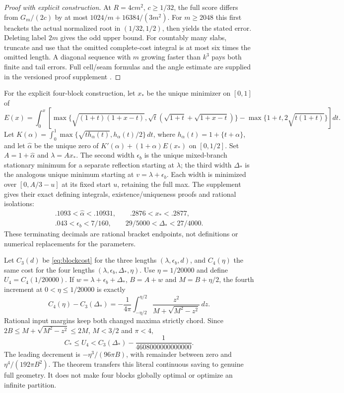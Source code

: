 \documentclass[11pt]{article}
\theoremstyle{definition}\newtheorem{definition}[theorem]{Definition}
\theoremstyle{remark}\newtheorem{remark}[theorem]{Remark}
\newcommand{\CC}{C_\ast}
\begin{document}
\begin{proof}[Proof with explicit construction]
At $R=4cm^2$, $c\ge1/32$, the full score differs from $G_m/(2c)$ by
at most $1024/m+16384/(3m^2)$. For $m\ge2048$ this first brackets
the actual normalized root in $(1/32,1/2)$, then yields the stated error.
Deleting label $2m$ gives the odd upper bound. For countably many slabs,
truncate and use that the omitted complete-cost integral is at most six
times the omitted length. A diagonal sequence with $m$ growing faster
than $k^3$ pays both finite and tail errors. Full cell/seam formulas and
the angle estimate are supplied in the versioned proof supplement \cite{blocks}.
\end{proof}

For the explicit four-block construction, let $x_*$ be the unique minimizer
on $[0,1]$ of
\[
 E(x)=\int_0^x\!\left[
 \max\{\sqrt{(1+t)(1+x-t)},\sqrt t(\sqrt{1+t}+\sqrt{1+x-t})\}
 -\max\{1+t,2\sqrt{t(1+t)}\}\right]dt.
\]
Let $K(\alpha)=\int_0^1\max\{\sqrt{t h_\alpha(t)},h_\alpha(t)/2\}\,dt$,
where $h_\alpha(t)=1+\{t+\alpha\}$, and let $\widehat\alpha$ be the
unique zero of $K'(\alpha)+(1+\alpha)E(x_*)$ on $[0,1/2]$.
Set $A=1+\widehat\alpha$ and $\lambda=Ax_*$.
The second width $\epsilon_b$ is the unique mixed-branch stationary
minimum for a separate reflection starting at $\lambda$; the third width
$\Delta_*$ is the analogous unique minimum starting at
$v=\lambda+\epsilon_b$. Each width is minimized over
$[0,A/3-u]$ at its fixed start $u$, retaining the full max.
The supplement \cite{upperinputs} gives their exact defining integrals,
existence/uniqueness proofs and rational isolations:
\[
\begin{gathered}
 .1093<\widehat\alpha<.10931,\qquad .2876<x_*<.2877,\\
 .043<\epsilon_b<7/160,\qquad 29/5000<\Delta_*<27/4000.
\end{gathered}
\]
These terminating decimals are rational bracket endpoints, not definitions
or numerical replacements for the parameters.

Let $C_3(d)$ be \eqref{eq:blockcost} for the three lengths
$(\lambda,\epsilon_b,d)$, and $C_4(\eta)$ the same cost for the four
lengths $(\lambda,\epsilon_b,\Delta_*,\eta)$.
Use $\eta=1/20000$ and define $U_4=C_4(1/20000)$.
If $w=\lambda+\epsilon_b+\Delta_*$, $B=A+w$ and
$M=B+\eta/2$, the fourth increment at $0<\eta\le1/20000$ is exactly
\[
 C_4(\eta)-C_3(\Delta_*)=
 -\frac1{4\pi}\int_{-\eta/2}^{\eta/2}
       \frac{z^2}{M+\sqrt{M^2-z^2}}\,dz.
\]
Rational input margins keep both changed maxima strictly chord.
Since $2B\le M+\sqrt{M^2-z^2}\le2M$, $M<3/2$ and $\pi<4$,
\begin{equation}\label{eq:U4}
 \CC\le U_4<C_3(\Delta_*)-\frac1{4608000000000000}.
\end{equation}
The leading decrement is $-\eta^3/(96\pi B)$, with remainder between
zero and $\eta^4/(192\pi B^2)$. The theorem transfers this literal
continuous saving to genuine full geometry. It does not make four blocks
globally optimal or optimize an infinite partition.
\end{document}
